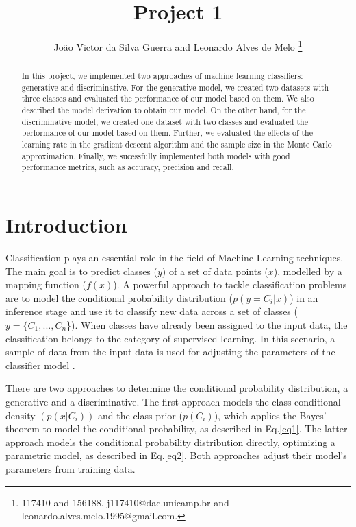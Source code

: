 \documentclass{article}
\begin{document}
\title{Project 1}
\author{
Jo\~ao Victor da Silva Guerra 
and
Leonardo Alves de Melo
\thanks{117410 and 156188. j117410@dac.unicamp.br and leonardo.alves.melo.1995@gmail.com.}
}

\maketitle

\begin{abstract}
  In this project, we implemented two approaches of machine learning classifiers: generative and discriminative. For the generative model, we created two datasets with three classes and evaluated the performance of our model based on them. We also described the model derivation to obtain our model. On the other hand, for the discriminative model, we created one dataset with two classes and evaluated the performance of our model based on them. Further, we evaluated the effects of the learning rate in the gradient descent algorithm and the sample size in the Monte Carlo approximation. Finally, we sucessfully implemented both models with good performance metrics, such as accuracy, precision and recall.
\end{abstract}

\section{Introduction}

Classification plays an essential role in the field of Machine Learning techniques.
The main goal is to predict classes ($y$) of a set of data points ($x$), modelled by a mapping function ($f(x)$). A powerful approach to tackle classification problems are to model the conditional probability distribution ($p(y = C_{i}|x)$) in an inference stage and use it to classify new data across a set of classes ($y = \{C_{1}, ..., C_{n}$\}). When classes have already been assigned to the input data, the classification belongs to the category of supervised learning. In this scenario, a sample of data from the input data is used for adjusting the parameters of the classifier model \cite{bishop2006, murphy2012, sathya2013}.

There are two approaches to determine the conditional probability distribution, a generative and a discriminative. The first approach models the class-conditional density $(p(x|C_{i}))$ and the class prior ($p(C_{i})$), which applies the Bayes' theorem to model the conditional probability, as described in Eq.\eqref{eq1}. The latter approach models the conditional probability distribution directly, optimizing a parametric model, as described in Eq.\eqref{eq2}. Both approaches adjust their model's parameters from training data.
\end{document}
